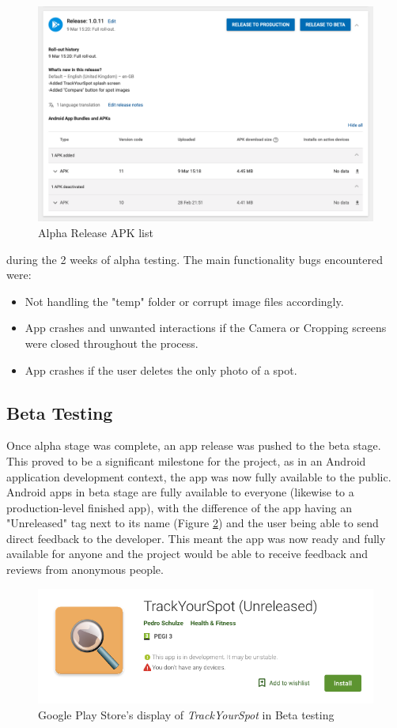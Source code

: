 \begin{figure}
    \includegraphics[width=1.2\textwidth, center]{figures/alpha_releases.png}
    \caption{Alpha Release APK list}
    \label{fig:alpha_releases.png}
\end{figure}
during the 2 weeks of alpha testing. The main functionality bugs encountered were:
\begin{itemize}
    \item Not handling the "temp" folder or corrupt image files accordingly.
    \item App crashes and unwanted interactions if the Camera or Cropping screens were closed throughout the process.
    \item App crashes if the user deletes the only photo of a spot. 
\end{itemize}

\subsection{Beta Testing}
Once alpha stage was complete, an app release was pushed to the beta stage. This proved to be a significant milestone for the project, as in an Android application development context, the app was now fully available to the public. Android apps in beta stage are fully available to everyone (likewise to a production-level finished app), with the difference of the app having an "Unreleased" tag next to its name (Figure \ref{fig:betarelease}) and the user being able to send direct feedback to the developer. This meant the app was now ready and fully available for anyone and the project would be able to receive feedback and reviews from anonymous people. 

\begin{figure}[H]
    \includegraphics[width=1.2\textwidth, center]{figures/betarelease.png}
    \caption{Google Play Store's display of \emph{TrackYourSpot} in Beta testing}
    \label{fig:betarelease}
\end{figure}

